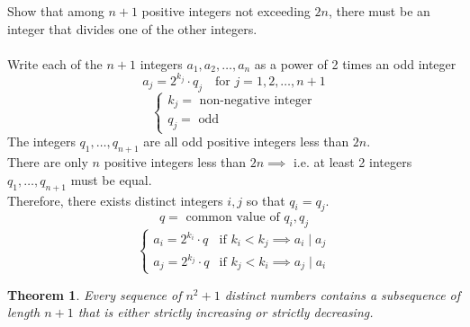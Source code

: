 \documentclass[letterpaper, 12pt]{article}
\newtheorem{theorem}{Theorem}[section]
\newenvironment{example}[1][Example]{\begin{trivlist}
\item[\hskip \labelsep {\bfseries #1}]}{\end{trivlist}}
\newcommand{\0}{\emptyset}
\begin{document}
    \begin{example}
        Show that among $n+1$ positive integers not exceeding $2n$, there must be an integer that 
        divides one of the other integers. \\
        \\
        Write each of the $n+1$ integers $a_1,a_2,\dots,a_n$ as a power of 2 times an odd integer
        \[a_j = 2^{k_j} \cdot q_j \quad \text{for } j = 1,2,\dots,n+1\]
        \[\begin{cases}
            k_j = \text{ non-negative integer} \\
            q_j = \text{ odd}
        \end{cases}\]
        The integers $q_1,\dots,q_{n+1}$ are all odd positive integers less than $2n$. \\
        There are only $n$ positive integers less than $2n \implies$ i.e. at least 2 integers 
        $q_1,\dots,q_{n+1}$ must be equal. \\
        Therefore, there exists distinct integers $i, j$ so that $q_i = q_j$.
        \[q = \text{ common value of } q_i, q_j\]
        \[\begin{cases}
            a_i = 2^{k_i} \cdot q & \text{if } k_i < k_j \implies a_i \mid a_j \\
            a_j = 2^{k_j} \cdot q & \text{if } k_j < k_i \implies a_j \mid a_i
        \end{cases}\]
    \end{example}
    \begin{theorem}
        Every sequence of $n^2 + 1$ distinct numbers contains a subsequence of length $n+1$ 
        that is either strictly increasing or strictly decreasing.
    \end{theorem}
\end{document}

